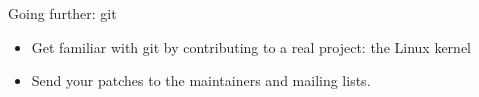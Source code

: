 \setuplabframe
{Going further: git}
{
  \begin{itemize}
  \item Get familiar with git by contributing to a real project: the
    Linux kernel
  \item Send your patches to the maintainers and mailing lists.
  \end{itemize}
}
